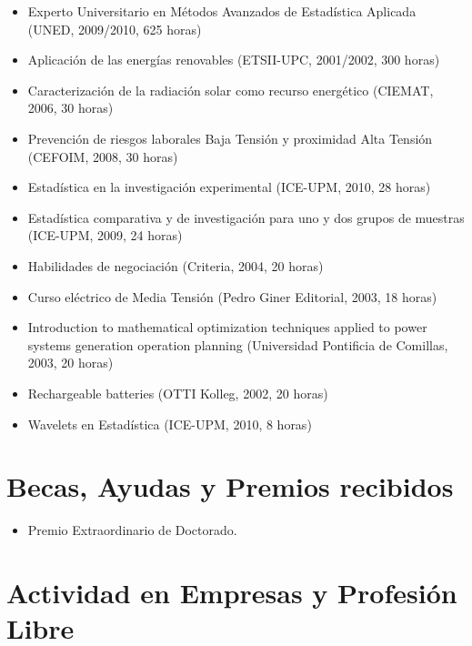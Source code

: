 \documentclass[article, a4paper]{memoir}
\begin{document}
\begin{itemize}
\item Experto Universitario en Métodos Avanzados de Estadística Aplicada (UNED, 2009/2010, 625 horas)

\item Aplicación de las energías renovables (ETSII-UPC, 2001/2002, 300 horas)

\item Caracterización de la radiación solar como recurso energético (CIEMAT, 2006, 30 horas)

\item Prevención de riesgos laborales Baja Tensión y proximidad Alta Tensión (CEFOIM, 2008, 30 horas)

\item Estadística en la investigación experimental (ICE-UPM, 2010, 28 horas)

\item Estadística comparativa y de investigación para uno y dos grupos de muestras (ICE-UPM, 2009, 24 horas)

\item Habilidades de negociación (Criteria, 2004, 20 horas)

\item Curso eléctrico de Media Tensión (Pedro Giner Editorial, 2003, 18 horas)

\item Introduction to mathematical optimization techniques applied to power systems generation operation planning (Universidad Pontificia de Comillas, 2003, 20 horas)

\item Rechargeable batteries (OTTI Kolleg, 2002, 20 horas)

\item Wavelets en Estadística (ICE-UPM, 2010, 8 horas)
\end{itemize}


\section{Becas, Ayudas y Premios recibidos}
\label{sec-10}

\begin{itemize}
\item Premio Extraordinario de Doctorado.
\end{itemize}


\section{Actividad en Empresas y Profesión Libre}
\label{sec-11}
\end{document}
